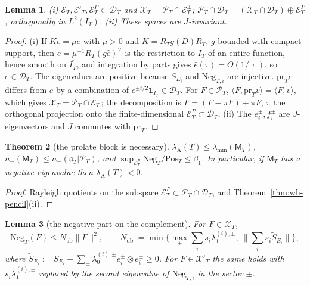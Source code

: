 \documentclass[11pt]{amsart}
\newtheorem{theorem}{Theorem}[section]
\newtheorem{lemma}[theorem]{Lemma}
\theoremstyle{definition}
\theoremstyle{remark}
\newcommand{\PT}{\mathcal P_T}
\newcommand{\IT}{I_T}
\newcommand{\lamA}{\lambda_{\mathrm A}(T)}
\begin{document}
\begin{lemma}\label{lem:wh-W}
\emph{(i)} $\mathcal E_T,\mathcal E'_T,\mathcal E^P_T\subset\mathcal D_T$ and $\mathcal X_T=\PT\cap\mathcal E_T^\perp$;
$\PT\cap\mathcal D_T=(\mathcal X_T\cap\mathcal D_T)\oplus\mathcal E^P_T$, orthogonally in $L^2(\IT)$. \emph{(ii)} These spaces are
$J$-invariant.
\end{lemma}

\begin{proof}
(i) If $Ke=\mu e$ with $\mu>0$ and $K=R_Tg(D)R_T$, $g$ bounded with compact support, then $e=\mu^{-1}R_T(g\widehat e)^\vee$
is the restriction to $\IT$ of an entire function, hence smooth on $\overline{\IT}$, and integration by parts gives
$\widehat e(\tau)=O(1/|\tau|)$, so $e\in\mathcal D_T$. The eigenvalues are positive because $S_{E_i}$ and
$\mathrm{Neg}_{T,i}$ are injective. $\mathrm{pr}_Te$ differs from $e$ by a combination of $e^{\pm t/2}\mathbf 1_{\IT}\in\mathcal D_T$.
For $F\in\PT$, $\langle F,\mathrm{pr}_Tv\rangle=\langle F,v\rangle$, which gives $\mathcal X_T=\PT\cap\mathcal E_T^\perp$; the
decomposition is $F=(F-\pi F)+\pi F$, $\pi$ the orthogonal projection onto the finite-dimensional
$\mathcal E^P_T\subset\mathcal D_T$. (ii) The $e^\pm_i,f^\pm_i$ are $J$-eigenvectors and $J$ commutes with $\mathrm{pr}_T$.
\end{proof}

\begin{theorem}[the prolate block is necessary]\label{thm:wh-necessary}
$\lamA\le\lambda_{\min}(\mathsf M_T)$, $n_-(\mathsf M_T)\le n_-(\mathfrak a_T|\PT)$, and
$\sup_{\mathcal E^P_T}\mathrm{Neg}_T/\mathrm{Pos}_T\le\beta_1$. In particular, if $\mathsf M_T$ has a negative eigenvalue then
$\lamA<0$.
\end{theorem}

\begin{proof}
Rayleigh quotients on the subspace $\mathcal E^P_T\subset\PT\cap\mathcal D_T$, and Theorem~\ref{thm:wh-pencil}(ii).
\end{proof}

\begin{lemma}[the negative part on the complement]\label{lem:wh-neg}
For $F\in\mathcal X_T$,
\[
\mathrm{Neg}_T(F)\le N_{\mathrm{ub}}\|F\|^2,\qquad
N_{\mathrm{ub}}:=\min\Big\{\max_\pm\sum_is_i\lambda^{(i),\pm}_1,\ \Big\|\sum_is_i\widetilde S_{E_i}\Big\|\Big\},
\]
where $\widetilde S_{E_i}:=S_{E_i}-\sum_\pm\lambda^{(i),\pm}_0e^\pm_i\otimes e^\pm_i\ge0$.
For $F\in\mathcal X'_T$ the same holds with $s_i\lambda^{(i),\pm}_1$ replaced by the second eigenvalue of
$\mathrm{Neg}_{T,i}$ in the sector $\pm$.
\end{lemma}
\end{document}
